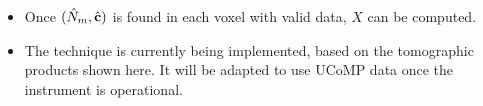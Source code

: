 \documentclass[a0,portrait,final]{baposter_old}
\def\azul#1{\textcolor{blue}{\bf\sf #1}}
\def\bc{{\bf c}}
\begin{document}
\begin{poster}
{{\begin{itemize}
\item Once \azul{$(\hat{N}_m, \hat{\bc})$} is found in each voxel with valid data, $X$ can be computed.

\item The technique is currently being implemented, based on the tomographic products shown here. It will be adapted to use UCoMP data once the instrument is operational.
\end{itemize}
}
}
\end{poster}
\end{document}
